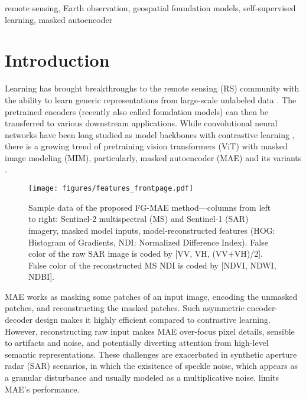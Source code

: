 \documentclass[lettersize,journal]{IEEEtran}
\begin{document}
\begin{IEEEkeywords}
remote sensing, Earth observation, geospatial foundation models, self-supervised learning, masked autoencoder
\end{IEEEkeywords}

\thispagestyle{copyright}

\vspace{-1em}
\section{Introduction}

 Learning has brought breakthroughs to the remote sensing (RS) community with the ability to learn generic representations from large-scale unlabeled data \cite{wang2022self}. The pretrained encoders (recently also called foundation models) can then be transferred to various downstream applications. While convolutional neural networks have been long studied as model backbones with contrastive learning \cite{jean2019tile2vec}, there is a growing trend of pretraining vision transformers (ViT) \cite{dosovitskiy2020image} with masked image modeling (MIM), particularly, masked autoencoder (MAE) \cite{he2022masked} and its variants \cite{cong2022satmae}.

\begin{figure}[]
  \centering
  \texttt{[image: figures/features\_frontpage.pdf]}
  \caption{Sample data of the proposed FG-MAE method---columns from left to right: Sentinel-2 multispectral (MS) and Sentinel-1 (SAR) imagery, masked model inputs, model-reconstructed features (HOG: Histogram of Gradients, NDI: Normalized Difference Index). False color of the raw SAR image is coded by [VV, VH, (VV+VH)/2]. False color of the reconstructed MS NDI is coded by [NDVI, NDWI, NDBI].}
  \vspace{-1em}
  \label{fig:features}
\end{figure}


MAE works as masking some patches of an input image, encoding the unmasked patches, and reconstructing the masked patches. Such asymmetric encoder-decoder design makes it highly efficient compared to contrastive learning. However, reconstructing raw input makes MAE over-focus pixel details, sensible to artifacts and noise, and potentially diverting attention from high-level semantic representations. These challenges are exacerbated in synthetic aperture radar (SAR) scenarios, in which the exisitence of speckle noise, which appears as a granular disturbance and usually modeled as a multiplicative noise, limits MAE's performance.
\end{document}
